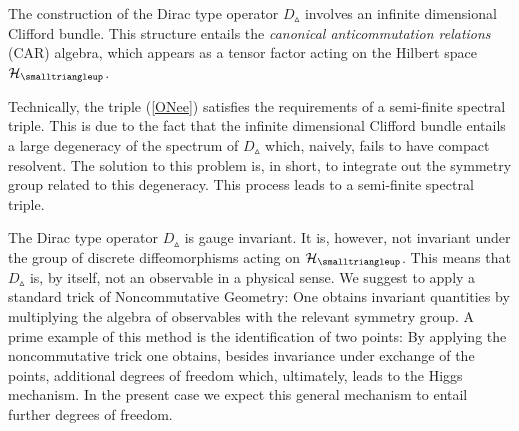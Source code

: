 \documentclass[12pt]{article}
\def\ch{{\cal H}}
\begin{document}
The construction of the Dirac type operator $D_{\smalltriangleup}$ involves an infinite dimensional Clifford bundle. This structure entails the {\it canonical anticommutation relations} (CAR) algebra, which appears as a tensor factor acting on the Hilbert space $\ch_\smalltriangleup$. 


Technically, the triple (\ref{ONee}) satisfies the requirements of a semi-finite spectral triple. This is due to the fact that the infinite dimensional Clifford bundle entails a large degeneracy of the spectrum of $D_{\smalltriangleup}$ which, naively, fails to have compact resolvent. The solution to this problem is, in short, to integrate out the symmetry group related to this degeneracy. This process leads to a semi-finite spectral triple.









































































The Dirac type operator $D_\smalltriangleup$ is gauge invariant. It is, however, not invariant under the group of discrete diffeomorphisms acting on $\ch_\smalltriangleup$. This means that $D_\smalltriangleup$ is, by itself, not an observable in a physical sense. We suggest to apply a standard trick of Noncommutative Geometry: One obtains invariant quantities by multiplying the algebra of observables with the relevant symmetry group. A prime example of this method is the identification of two points: By applying the noncommutative trick one obtains, besides invariance under exchange of the points, additional degrees of freedom which, ultimately, leads to the Higgs mechanism. In the present case we expect this general mechanism to entail further degrees of freedom. 
\end{document}
